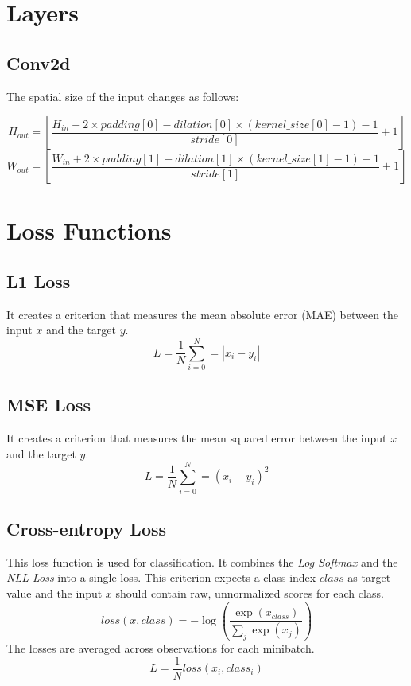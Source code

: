 \section{Layers}
\subsection{Conv2d}
The spatial size of the input changes as follows:

\begin{equation}
    H_{out} = \left\lfloor \frac{H_{in}+2\times padding[0] - dilation[0]\times (kernel\_size[0]-1)-1}{stride[0]}+1 \right\rfloor
\end{equation}
\begin{equation}
    W_{out} = \left\lfloor \frac{W_{in}+2\times padding[1]-dilation[1]\times(kernel\_size[1]-1)-1}{stride[1]}+1 \right\rfloor
\end{equation}

\section{Loss Functions}

\subsection{L1 Loss}
It creates a criterion that measures the mean absolute error (MAE) between the input $x$ and the target $y$.
\begin{equation}
    L = \frac{1}{N} \sum_{i=0}^{N} = |x_i - y_i|
\end{equation}

\subsection{MSE Loss}
It creates a criterion that measures the mean squared error between the input $x$ and the target $y$.
\begin{equation}
    L =  \frac{1}{N} \sum_{i=0}^{N} = (x_i - y_i)^2
\end{equation}

\subsection{Cross-entropy Loss}
This loss function is used for classification. It combines the \textit{Log Softmax} and the \textit{NLL Loss} into a single loss. 
This criterion expects a class index $class$ as target value and the input $x$ should contain raw, unnormalized scores for each class.
\begin{equation}
    loss(x, class) = -\log \left(\frac{\exp(x_{class})}{\sum_j \exp(x_j)}\right)
\end{equation}
The losses are averaged across observations for each minibatch.
\begin{equation}
    L = \frac{1}{N} loss(x_i, class_i)
\end{equation}

